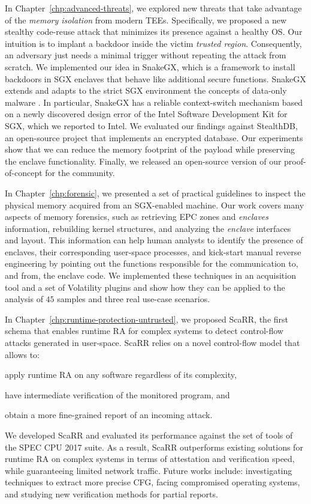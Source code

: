In Chapter~\ref{chp:advanced-threats}, we explored new threats that take 
advantage of the \emph{memory isolation} from modern TEEs.
Specifically, we proposed a new stealthy code-reuse attack that minimizes its 
presence against a healthy OS.
Our intuition is to implant a backdoor inside the victim \emph{trusted region}. 
Consequently, an adversary just needs a minimal trigger without repeating the 
attack from scratch.
We implemented our idea in SnakeGX, which is a framework to install backdoors 
in SGX enclaves that behave like additional secure functions.
SnakeGX extends and adapts to the strict SGX environment the concepts of 
data-only malware \citep{vogl2014persistent}.
In particular, SnakeGX has a reliable context-switch mechanism based on a newly 
discovered design error of the Intel Software Development Kit for SGX, which we 
reported to Intel.
We evaluated our findings against StealthDB, an open-source project that 
implements an encrypted database.
Our experiments show that we can reduce the memory footprint of the payload 
while preserving the enclave functionality.
Finally, we released an open-source version of our proof-of-concept for the 
community.

In Chapter~\ref{chp:forensic}, we presented a set of practical guidelines to 
inspect the physical memory acquired from an SGX-enabled machine.
Our work covers many aspects of memory forensics, such as retrieving EPC zones 
and \emph{enclaves} information, rebuilding kernel structures, and analyzing 
the \emph{enclave} interfaces and layout. This information can help 
human analysts to identify the presence of enclaves, their corresponding
user-space processes, and kick-start manual reverse engineering 
by pointing out the functions responsible for the communication to, and from,
the enclave code. 
We implemented these techniques in an acquisition tool and a set of
Volatility plugins and show how they can be applied to the analysis of $45$
samples and three real use-case scenarios.

In Chapter~\ref{chp:runtime-protection-untrusted}, we proposed ScaRR, the first 
schema that enables runtime RA for complex systems to detect control-flow 
attacks generated in user-space.
ScaRR relies on a novel control-flow model that allows to:
\begin{enumerate*}[label=(\roman*)]
	\item apply runtime RA on any software regardless of its complexity,
	\item have intermediate verification of the monitored program, and
	\item obtain a more fine-grained report of an incoming attack.
\end{enumerate*}
We developed ScaRR and evaluated its performance against the set of tools of 
the SPEC CPU 2017 suite.
As a result, ScaRR outperforms existing solutions for runtime RA on complex 
systems in terms of attestation and verification speed, while guaranteeing
limited network traffic.
Future works include: investigating techniques to extract more precise CFG, 
facing compromised operating systems, and studying new verification methods for 
partial reports.


